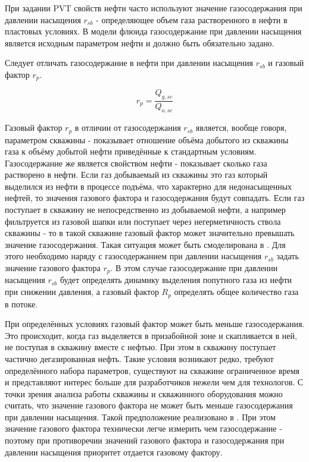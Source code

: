 При задании PVT свойств нефти часто используют значение газосодержания при давлении насыщения $r_{sb}$ - определяющее объем газа растворенного в нефти в пластовых условиях. В модели флюида \unf{} газосодержание при давлении насыщения является исходным параметром нефти и должно быть обязательно задано. 

Следует отличать газосодержание в нефти при давлении насыщения $r_{sb}$ и газовый фактор $r_p$.

$$r_p = \frac{Q_{g,sc}}{Q_{o,sc}}$$

Газовый фактор $r_{p}$  в отличии от газосодержания $r_{sb}$  является, вообще говоря, параметром скважины - показывает отношение объёма добытого из скважины газа  к объёму добытой нефти приведённые к стандартным условиям. Газосодержание же является свойством нефти - показывает сколько газа растворено в нефти. Если газ добываемый из скважины это газ который выделился из нефти в процессе подъёма, что характерно для недонасыщенных нефтей, то значения газового фактора и газосодержания будут совпадать. Если газ поступает в скважину не непосредственно из добываемой нефти, а например фильтруется из газовой шапки или поступает через негерметичность ствола скважины - то в такой скважине газовый фактор может значительно превышать значение газосодержания. Такая ситуация может быть смоделирована в \unf{}. Для этого необходимо наряду с газосодержанием при давлении насыщения $r_{sb}$ задать значение газового фактора $r_p$. В этом случае газосодержание при давлении насыщения $r_{sb}$  будет определять динамику выделения попутного газа из нефти при снижении давления, а газовый фактор $R_p$ определять общее количество газа в потоке. 

При определённых условиях газовый фактор может быть меньше газосодержания. Это происходит, когда газ выделяется в призабойной зоне и скапливается в ней, не поступая в скважину вместе с нефтью. При этом в скважину поступает частично дегазированная нефть. Такие условия возникают редко, требуют определённого набора параметров, существуют на скважине ограниченное время и представляют интерес больше для разработчиков нежели чем для технологов. С точки зрения анализа работы скважины и скважинного оборудования можно считать, что значение газового фактора не может быть меньше газосодержания при давлении насыщения. Такой предположение реализовано в \unf{}. При этом значение газового фактора технически легче измерить чем газосодержание - поэтому при противоречии значений газового фактора и газосодержания при давлении насыщения приоритет отдается газовому фактору. 

